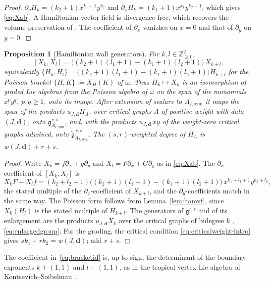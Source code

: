 \documentclass[11pt]{amsart}
\newtheorem{proposition}[theorem]{Proposition}
\theoremstyle{definition}
\theoremstyle{remark}
\newcommand{\ZZ}{\mathbb{Z}}
\newcommand{\gfrak}{\mathfrak{g}}
\begin{document}
\begin{proof}
$\partial_{y}H_{k}=(k_2+1)x^{k_1+1}y^{k_2}$ and
$\partial_{x}H_{k}=(k_1+1)x^{k_1}y^{k_2+1}$, which gives \eqref{eq:Xab}.  A
Hamiltonian vector field is divergence-free, which recovers the
volume-preservation of \cite[p.~89]{GKT}.  The coefficient of $\partial_x$
vanishes on $x=0$ and that of $\partial_y$ on $y=0$.
\end{proof}

\begin{proposition}[Hamiltonian wall generators]
\label{prop:ham}
For $k,l\in\ZZ^2_{\ge0}$,
\begin{equation}
\label{eq:bracketid}
[X_{k},X_{l}]=\bigl((k_2+1)(l_1+1)-(k_1+1)(l_2+1)\bigr)\,X_{k+l},
\end{equation}
equivalently $\{H_k,H_l\}=\bigl((k_2+1)(l_1+1)-(k_1+1)(l_2+1)\bigr)H_{k+l}$
for the Poisson bracket $\{H,K\}:=X_H(K)$ of $\omega$.  Thus $H_k\mapsto X_k$
is an isomorphism of graded Lie algebras from the Poisson algebra of $\omega$
on the span of the monomials $x^py^q$, $p,q\ge1$, onto its image.  After
extension of scalars to $A_{I,\mathrm{sym}}$ it maps the span of the products
$u_{J,\mathbf d}H_\Lambda$, over critical graphs $\Lambda$ of positive weight
with data $(J,\mathbf d)$, onto $\gfrak^{r,s}_{A_{I,\mathrm{sym}}}$, and, with
the products $u_{J,\mathbf d}\,xy$ of the weight-zero critical graphs
adjoined, onto $\widetilde{\gfrak}^{\,r,s}_{A_{I,\mathrm{sym}}}$.  The
$(s,r)$-weighted degree of $H_\Lambda$ is $w(J,\mathbf d)+r+s$.
\end{proposition}

\begin{proof}
Write $X_{k}=f\partial_{x}+g\partial_{y}$ and $X_{l}=F\partial_{x}+G\partial_{y}$
as in \eqref{eq:Xab}.  The $\partial_x$-coefficient of $[X_k,X_l]$ is
\[
X_{k}F-X_{l}f
=(k_2+l_2+1)\bigl((k_2+1)(l_1+1)-(k_1+1)(l_2+1)\bigr)\,x^{k_1+l_1+1}y^{k_2+l_2},
\]
the stated multiple of the $\partial_x$-coefficient of $X_{k+l}$, and the
$\partial_y$-coefficients match in the same way.  The Poisson form follows
from Lemma~\ref{lem:hamvf}, since $X_{k}(H_l)$ is the stated multiple of
$H_{k+l}$.  The generators of $\gfrak^{r,s}$ and of its enlargement are the
products $u_{J,\mathbf d}X_{k}$ over the critical graphs of bidegree $k$
\cite[Definition~4.23]{GKT}, \eqref{eq:enlargedgroup}.  For the grading, the
critical condition \eqref{eq:criticalweight-intro} gives
$sk_1+rk_2=w(J,\mathbf d)$; add $r+s$.
\end{proof}

The coefficient in~\eqref{eq:bracketid} is, up to sign, the determinant of
the boundary exponents $k+(1,1)$ and $l+(1,1)$, as in the tropical vertex Lie
algebra of Kontsevich--Soibelman \cite{KS06,Gross10}.
\end{document}
